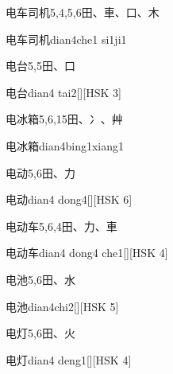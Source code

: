\begin{entry}{电车司机}{5,4,5,6}{⽥、⾞、⼝、⽊}
  \begin{phonetics}{电车司机}{dian4che1 si1ji1}
  \end{phonetics}
\end{entry}

\begin{entry}{电台}{5,5}{⽥、⼝}
  \begin{phonetics}{电台}{dian4 tai2}[][HSK 3]
  \end{phonetics}
\end{entry}

\begin{entry}{电冰箱}{5,6,15}{⽥、⼎、⾋}
  \begin{phonetics}{电冰箱}{dian4bing1xiang1}
  \end{phonetics}
\end{entry}

\begin{entry}{电动}{5,6}{⽥、⼒}
  \begin{phonetics}{电动}{dian4 dong4}[][HSK 6]
  \end{phonetics}
\end{entry}

\begin{entry}{电动车}{5,6,4}{⽥、⼒、⾞}
  \begin{phonetics}{电动车}{dian4 dong4 che1}[][HSK 4]
  \end{phonetics}
\end{entry}

\begin{entry}{电池}{5,6}{⽥、⽔}
  \begin{phonetics}{电池}{dian4chi2}[][HSK 5]
  \end{phonetics}
\end{entry}

\begin{entry}{电灯}{5,6}{⽥、⽕}
  \begin{phonetics}{电灯}{dian4 deng1}[][HSK 4]
  \end{phonetics}
\end{entry}

